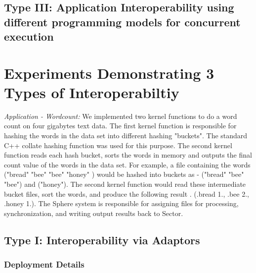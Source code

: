 \documentclass[3p,twocolumn]{elsarticle}
\begin{document}

\subsection{Type III: Application Interoperability using different
  programming models for concurrent execution}


            

\section{Experiments Demonstrating 3 Types of Interoperabiltiy}

{\it Application - Wordcount: } We implemented two kernel functions to
do a word count on four gigabytes text data.  The first kernel
function is responsible for hashing the words in the data set into
different hashing "buckets". The standard C++ collate hashing function
was used for this purpose. The second kernel function reads each hash
bucket, sorts the words in memory and outputs the final count value of
the words in the data set.  For example, a file containing the words
("bread" "bee" "bee" "honey" ) would be hashed into buckets as -
("bread" "bee" "bee") and ("honey").  The second kernel function would
read these intermediate bucket files, sort the words, and produce the
following result . (.bread 1., .bee 2., .honey 1.).  The Sphere system
is responsible for assigning files for processing, synchronization,
and writing output results back to Sector.


\subsection{Type I: Interoperability via Adaptors}

\subsubsection{Deployment Details}
\end{document}
